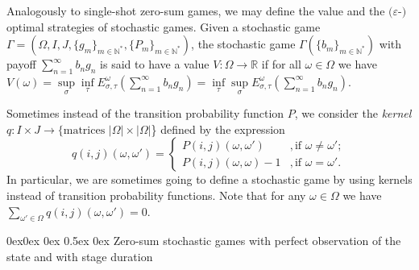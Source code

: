 \documentclass[english,openary,12pt]{article}
\makeatletter
\renewcommand\subsection{\@startsection{subsection}{2}{\z@}%
                                     {0ex\@plus 0ex \@minus 0ex}%
                                     {0.5ex \@plus 0ex}%
                                     {\normalfont\Large\bfseries}}%
\theoremstyle{definition}
\newcommand{\R}{\mathbb{R}}
\newcommand{\N}{\mathbb{N}}
\makeatother
\begin{document}
Analogously to single-shot zero-sum games, we may define the value and 
the $(\varepsilon$-$)$optimal strategies of stochastic games.
Given a stochastic game 
$\Gamma = (\Omega, I, J, \{g_m\}_{m\in\N^*}, \{P_m\}_{m\in\N^*})$,
the stochastic game $\Gamma(\{b_m\}_{m \in \N^*})$ with payoff 
$\sum_{n=1}^\infty b_n g_n$ is said to have a value 
$V : \Omega \to \R$ if for all $\omega \in \Omega$ we have
$V(\omega) = \sup\limits_{\sigma} \inf\limits_{\tau} E^\omega_{\sigma, \tau} 
\left(\sum\nolimits_{n=1}^\infty b_n g_n\right) = 
\inf\limits_{\tau} \sup\limits_{\sigma} E^\omega_{\sigma, \tau} 
\left(\sum\nolimits_{n=1}^\infty b_n g_n\right).$



Sometimes instead of the transition probability 
function $P$, we consider the \emph{kernel}\\
$q : I \times J \to 
\{\text{matrices } |\Omega| \times |\Omega|$\}
defined
by the expression
$$q(i,j)(\omega, \omega') = 
\begin{cases}
P(i,j)(\omega, \omega') &,\text{if } \omega \neq \omega';\\
P(i,j)(\omega, \omega) - 1 &,\text{if } \omega = \omega'.
\end{cases}$$
In particular, we are sometimes going to define a stochastic game by using 
kernels instead of transition probability functions. 
Note that for any $\omega \in \Omega$ we have
$\sum_{\omega' \in \Omega} q(i,j)(\omega, \omega') = 0$.

\subsection{Zero-sum stochastic games with perfect observation of the state 
and with stage duration}
\label{one-h}
\end{document}
